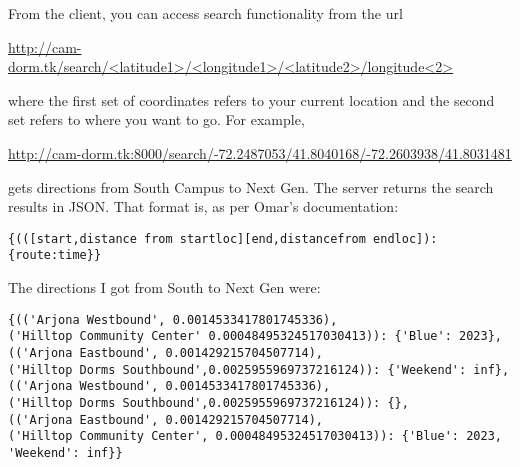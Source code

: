 \documentclass[11pt,letterpaper]{article}
\begin{document}
\noindent From the client, you can access search functionality from the url 

\url{http://cam-dorm.tk/search/<latitude1>/<longitude1>/<latitude2>/longitude<2>} 

\noindent where the first set of coordinates refers to your current location and the second set refers to where you want to go. For example, 

\url{http://cam-dorm.tk:8000/search/-72.2487053/41.8040168/-72.2603938/41.8031481} 

\noindent gets directions from South Campus to Next Gen. The server returns the search results in JSON. That format is, as per Omar's documentation:

\begin{verbatim}
{(([start,distance from startloc][end,distancefrom endloc]):{route:time}}
\end{verbatim}

\noindent The directions I got from South to Next Gen were:
\begin{verbatim}
{(('Arjona Westbound', 0.0014533417801745336),
('Hilltop Community Center' 0.00048495324517030413)): {'Blue': 2023},
(('Arjona Eastbound', 0.001429215704507714), 
('Hilltop Dorms Southbound',0.0025955969737216124)): {'Weekend': inf}, 
(('Arjona Westbound', 0.0014533417801745336), 
('Hilltop Dorms Southbound',0.0025955969737216124)): {}, 
(('Arjona Eastbound', 0.001429215704507714), 
('Hilltop Community Center', 0.00048495324517030413)): {'Blue': 2023, 'Weekend': inf}}
\end{verbatim}
\end{document}
